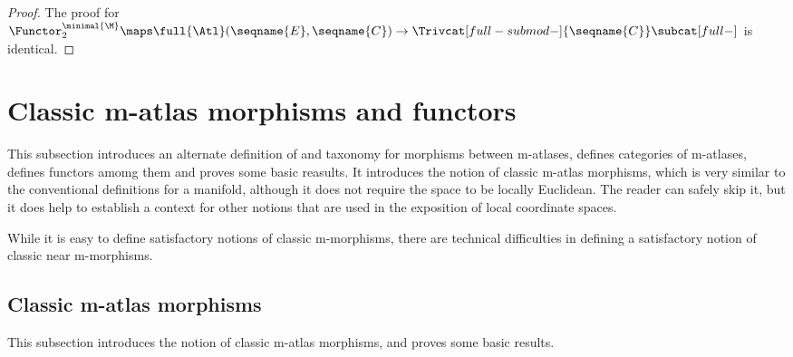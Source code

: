 \documentclass{article}
\begin{document}
\begin{theorem}
\begin{proof}
The proof for
$
  \Functor^{\minimal{\M}}_2 \maps
  \full{\Atl}(\seqname{E}, \seqname{C}) \to
  \Trivcat[full-submod-]{\seqname{C}} \subcat[full-]
$
is identical.
\end{proof}
\end{theorem}

\section{Classic m-atlas morphisms and functors}
\label{sec:M-ATLcmorph}
This subsection introduces an alternate definition of and taxonomy for
morphisms between m-atlases, defines categories of m-atlases, defines
functors amomg them and proves some basic reasults.  It introduces the
notion of classic m-atlas morphisms, which is very similar to
the conventional definitions for a manifold, although it does not
require the space to be locally Euclidean. The reader can safely skip
it, but it does help to establish a context for other notions that are
used in the exposition of local coordinate spaces.

While it is easy to define satisfactory notions of classic m-morphisms,
there are technical difficulties in defining a satisfactory notion of
classic near m-morphisms.

\subsection{Classic m-atlas morphisms}
\label{sub:M-ATLcmorph}
This subsection introduces the notion of classic m-atlas morphisms, and
proves some basic results.
\end{document}
